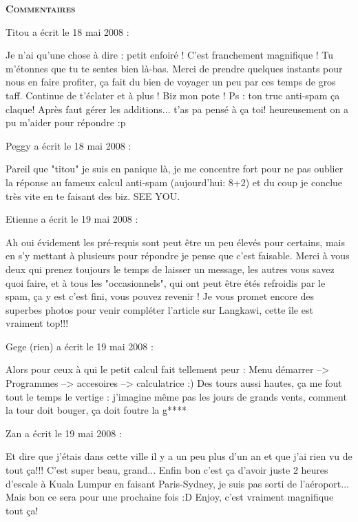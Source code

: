 \bigskip
\textbf{\textsc{Commentaires}}

\medskip
Titou a écrit le 18 mai 2008 :
\begin{displayquote}
Je n'ai qu'une chose à dire : petit enfoiré ! C'est franchement magnifique ! Tu m'étonnes que tu te sentes bien là-bas. Merci de prendre quelques instants pour nous en faire profiter, ça fait du bien de voyager un peu par ces temps de gros taff. Continue de t'éclater et à plus ! Biz mon pote !
Ps : ton truc anti-spam ça claque! Après faut gérer les additions... t'as pa pensé à ça toi! heureusement on a pu m'aider pour répondre :p
\end{displayquote}

\medskip
Peggy a écrit le 18 mai 2008 :
\begin{displayquote}
Pareil que "titou" je suis en panique là, je me concentre fort pour ne pas oublier la réponse au fameux calcul anti-spam (aujourd'hui: 8+2) et du coup je conclue très vite en te faisant des biz.
SEE YOU.
\end{displayquote}

\medskip
Etienne a écrit le 19 mai 2008 :
\begin{displayquote}
Ah oui évidement les pré-requis sont peut être un peu élevés pour certains, mais en s'y mettant à plusieurs pour répondre je pense que c'est faisable.
Merci à vous deux qui prenez toujours le temps de laisser un message, les autres vous savez quoi faire, et à tous les "occasionnels", qui ont peut être étés refroidis par le spam, ça y est c'est fini, vous pouvez revenir !
Je vous promet encore des superbes photos pour venir compléter l'article sur Langkawi, cette île est vraiment top!!!
\end{displayquote}

\medskip
Gege (rien) a écrit le 19 mai 2008 :
\begin{displayquote}
Alors pour ceux à qui le petit calcul fait tellement peur : Menu démarrer --> Programmes --> accesoires --> calculatrice :)
Des tours aussi hautes, ça me fout tout le temps le vertige : j'imagine même pas les jours de grands vents, comment la tour doit bouger, ça doit foutre la g****
\end{displayquote}

\medskip
Zan a écrit le 19 mai 2008 :
\begin{displayquote}
Et dire que j'étais dans cette ville il y a un peu plus d'un an et que j'ai rien vu de tout ça!!! C'est super beau, grand...
Enfin bon c'est ça d'avoir juste 2 heures d'escale à Kuala Lumpur en faisant Paris-Sydney, je suis pas sorti de l'aéroport... Mais bon ce sera pour une prochaine fois :D
Enjoy, c'est vraiment magnifique tout ça!
\end{displayquote}

\vfill
